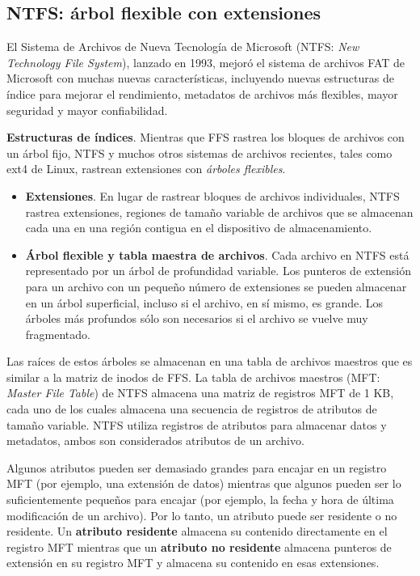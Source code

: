 \documentclass[10pt]{book}
\begin{document}
\subsection{NTFS: árbol flexible con extensiones}
El Sistema de Archivos de Nueva Tecnología de Microsoft (NTFS: \textit{New Technology File System}), lanzado en 1993, mejoró el sistema de archivos FAT de Microsoft con muchas nuevas características, incluyendo nuevas estructuras de índice para mejorar el rendimiento, metadatos de archivos más flexibles, mayor seguridad y mayor confiabilidad.

\textbf{Estructuras de índices}. Mientras que FFS rastrea los bloques de archivos con un árbol fijo, NTFS y muchos otros sistemas de archivos recientes, tales como ext4 de Linux, rastrean extensiones con \textit{árboles flexibles}.
\begin{itemize}
\item \textbf{Extensiones}. En lugar de rastrear bloques de archivos individuales, NTFS rastrea extensiones, regiones de tamaño variable de archivos que se almacenan cada una en una región contigua en el dispositivo de almacenamiento.
\item \textbf{Árbol flexible y tabla maestra de archivos}. Cada archivo en NTFS está representado por un árbol de profundidad variable. Los punteros de extensión para un archivo con un pequeño número de extensiones se pueden almacenar en un árbol superficial, incluso si el archivo, en sí mismo, es grande. Los árboles más profundos sólo son necesarios si el archivo se vuelve muy fragmentado.
\end{itemize}

Las raíces de estos árboles se almacenan en una tabla de archivos maestros que es similar a la matriz de inodos de FFS. La tabla de archivos maestros (MFT: \textit{Master File Table}) de NTFS almacena una matriz de registros MFT de 1 KB, cada uno de los cuales almacena una secuencia de registros de atributos de tamaño variable. NTFS utiliza registros de atributos para almacenar datos y metadatos, ambos son considerados atributos de un archivo.

Algunos atributos pueden ser demasiado grandes para encajar en un registro MFT (por ejemplo, una extensión de datos) mientras que algunos pueden ser lo suficientemente pequeños para encajar (por ejemplo, la fecha y hora de última modificación de un archivo). Por lo tanto, un atributo puede ser residente o no residente. Un \textbf{atributo residente} almacena su contenido directamente en el registro MFT mientras que un \textbf{atributo no residente} almacena punteros de extensión en su registro MFT y almacena su contenido en esas extensiones.
\end{document}
